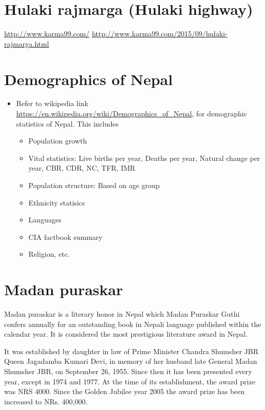 \documentclass[
]{book}
\providecommand{\tightlist}{%
  \setlength{\itemsep}{0pt}\setlength{\parskip}{0pt}}
\begin{document}
\hypertarget{hulaki-rajmarga-hulaki-highway}{%
\section{Hulaki rajmarga (Hulaki highway)}\label{hulaki-rajmarga-hulaki-highway}}

\url{http://www.karma99.com/}
\url{http://www.karma99.com/2015/09/hulaki-rajmarga.html}

\hypertarget{demographics-of-nepal}{%
\section{Demographics of Nepal}\label{demographics-of-nepal}}

\begin{itemize}
\tightlist
\item
  Refer to wikipedia link \url{https://en.wikipedia.org/wiki/Demographics_of_Nepal}, for demographic statistics of Nepal. This includes

  \begin{itemize}
  \tightlist
  \item
    Population growth
  \item
    Vital statistics: Live births per year, Deaths per year, Natural change per year, CBR, CDR, NC, TFR, IMR
  \item
    Population structure: Based on age group
  \item
    Ethnicity statisics
  \item
    Languages
  \item
    CIA factbook summary
  \item
    Religion, etc.
  \end{itemize}
\end{itemize}

\hypertarget{madan-puraskar}{%
\section{Madan puraskar}\label{madan-puraskar}}

Madan puraskar is a literary honor in Nepal which Madan Puraskar Guthi confers annually for an outstanding book in Nepali language published within the calendar year. It is considered the most prestigious literature award in Nepal.

It was established by daughter in law of Prime Minister Chandra Shumsher JBR Queen Jagadamba Kumari Devi, in memory of her husband late General Madan Shumsher JBR, on September 26, 1955. Since then it has been presented every year, except in 1974 and 1977. At the time of its establishment, the award prize was NRS 4000. Since the Golden Jubilee year 2005 the award prize has been increased to NRs. 400,000.
\end{document}
